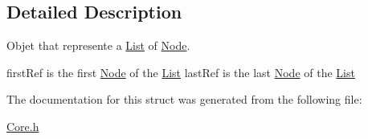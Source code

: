 \subsection{Detailed Description}
Objet that represente a \hyperlink{structList}{List} of \hyperlink{structNode}{Node}. 

first\-Ref is the first \hyperlink{structNode}{Node} of the \hyperlink{structList}{List} last\-Ref is the last \hyperlink{structNode}{Node} of the \hyperlink{structList}{List} 

The documentation for this struct was generated from the following file\-:\begin{DoxyCompactItemize}
\item 
\hyperlink{Core_8h}{Core.\-h}\end{DoxyCompactItemize}
